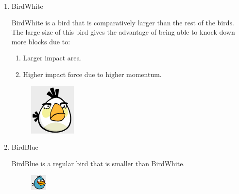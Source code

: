 \documentclass{dalthesis}
\begin{document}
\begin{enumerate}
\begin{enumerate}
    \begin{enumerate}
      \item BirdWhite

      BirdWhite is a bird that is comparatively larger than the rest of the birds. The large size of this bird gives the advantage of being able to knock down more blocks due to:

      \begin{enumerate}
        \item Larger impact area.
        \item Higher impact force due to higher momentum.
      \end{enumerate}

      \begin{figure}[H]
        \includegraphics[width=.5\textwidth,keepaspectratio]{birds/white.png}
      \end{figure}

      \item BirdBlue

      BirdBlue is a regular bird that is smaller than BirdWhite.

      \begin{figure}[H]
        \includegraphics[width=.5\textwidth,keepaspectratio]{birds/blue.png}
      \end{figure}


\end{enumerate}
\end{enumerate}
\end{enumerate}
\end{document}
